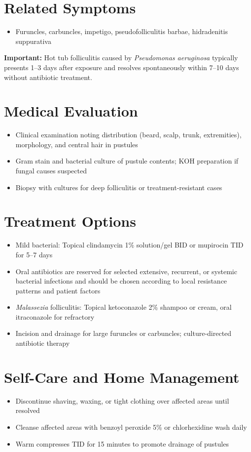 \section*{Related Symptoms}
\begin{itemize}
  \item Furuncles, carbuncles, impetigo, pseudofolliculitis barbae, hidradenitis suppurativa
\end{itemize}
\textbf{Important:} Hot tub folliculitis caused by \textit{Pseudomonas aeruginosa} typically presents 1--3 days after exposure and resolves spontaneously within 7--10 days without antibiotic treatment.

\section*{Medical Evaluation}
\begin{itemize}
  \item Clinical examination noting distribution (beard, scalp, trunk, extremities), morphology, and central hair in pustules
  \item Gram stain and bacterial culture of pustule contents; KOH preparation if fungal causes suspected
  \item Biopsy with cultures for deep folliculitis or treatment-resistant cases
\end{itemize}

\section*{Treatment Options}
\begin{itemize}
  \item Mild bacterial: Topical clindamycin 1\% solution/gel BID or mupirocin TID for 5--7 days
  \item Oral antibiotics are reserved for selected extensive, recurrent, or systemic bacterial infections and should be chosen according to local resistance patterns and patient factors
  \item \textit{Malassezia} folliculitis: Topical ketoconazole 2\% shampoo or cream, oral itraconazole for refractory
  \item Incision and drainage for large furuncles or carbuncles; culture-directed antibiotic therapy
\end{itemize}

\section*{Self-Care and Home Management}
\begin{itemize}
  \item Discontinue shaving, waxing, or tight clothing over affected areas until resolved
  \item Cleanse affected areas with benzoyl peroxide 5\% or chlorhexidine wash daily
  \item Warm compresses TID for 15 minutes to promote drainage of pustules
\end{itemize}

